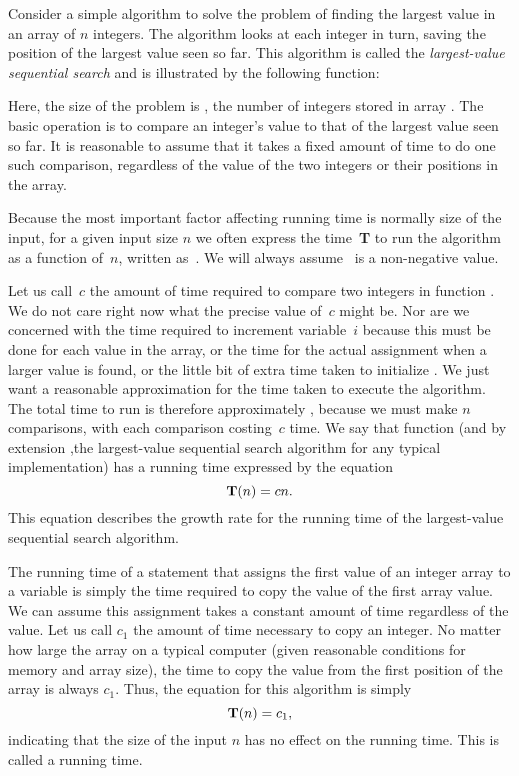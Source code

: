 \begin{example}
\label{SeqMax}
Consider a simple algorithm to solve the problem of finding the
largest value in an array of \(n\) integers.
The algorithm looks at each integer in turn, saving the position of
the largest value seen so far.
This algorithm is called the \emph{largest-value sequential search}
and is illustrated by the following function:


\noindent Here, the size of the problem is ,
the number of integers stored in array .
The basic operation
is to compare an integer's value to that of the
largest value seen so far.
It is reasonable to assume that it takes a fixed amount of time to do
one such comparison, regardless of the value of the two
integers or their positions in the array.

Because the most important factor affecting running time is normally
size of the input, for a given input size \(n\) we often express the
time~{\bf T} to  run the algorithm as a function of~\(n\), written
as~\Tn.
We will always assume \Tn\ is a non-negative value.

Let us call~\(c\) the amount of time required to compare two integers
in function .
We do not care right now what the precise value of~\(c\) might be.
Nor are we concerned with the time required to increment
variable~\(i\) because this must be done for each value in the array,
or the time for the actual assignment when a larger value is found,
or the little bit of extra time taken to initialize .
We just want a reasonable approximation for the time taken to execute
the algorithm.
The total time to run  is therefore approximately \cn,
because we must make \(n\) comparisons, with each comparison
costing~\(c\) time.
We say that function 
(and by extension ,the largest-value sequential search algorithm for
any typical implementation) has a running time expressed
by the equation
\[\mbox{$\textbf{T}(n)$} = \mbox{$c n$}.\]
\noindent This equation describes the
growth rate for the
running time of the largest-value sequential search
algorithm.
\end{example}

\begin{example}

The
running time of a statement that assigns the first value of an
integer array to a variable is simply the time required to copy the
value of the first array value.
We can assume this assignment takes a constant amount of time
regardless of the value.
Let us call \(c_1\) the amount of time necessary to copy an integer.
No matter how large the array on a typical computer (given reasonable
conditions for memory and array size), the time to copy the value from
the first position of the array is always \(c_1\).
Thus, the equation for this algorithm is simply
\[\mbox{$\textbf{T}(n)$} = c_1,\]
indicating that the size of the input \(n\) has no effect on
the running time.
This is called a  running time.
\end{example}

